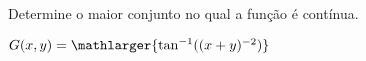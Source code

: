 
Determine o maior conjunto no qual a função é contínua.


\item $ G(x,y)=\mathlarger{\tan^{-1}((x+y)^{-2})}$